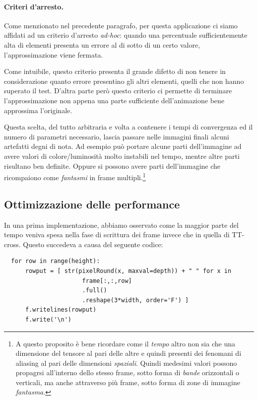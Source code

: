 \documentclass[11pt,a4paper]{article}
\begin{document}
\paragraph{Criteri d'arresto.}
Come menzionato nel precedente paragrafo, per questa applicazione ci siamo affidati ad un criterio d'arresto \emph{ad-hoc}: quando una percentuale sufficientemente alta di elementi presenta un errore al di sotto di un certo valore, l'approssimazione viene fermata.

Come intuibile, questo criterio presenta il grande difetto di non tenere in considerazione quanto errore presentino gli altri elementi, quelli che non hanno superato il test.
D'altra parte però questo criterio ci permette di terminare l'approssimazione non appena una parte sufficiente dell'animazione bene approssima l'originale.

Questa scelta, del tutto arbitraria e volta a contenere i tempi di convergenza ed il numero di parametri necessario, lascia passare nelle immagini finali alcuni artefatti degni di nota. Ad esempio può portare alcune parti dell'immagine ad avere valori di colore/luminosità molto instabili nel tempo, mentre altre parti risultano ben definite. Oppure si possono avere parti dell'immagine che ricompaiono come \emph{fantasmi} in frame  multipli.\footnote{A questo proposito è bene ricordare come il \emph{tempo} altro non sia che una dimensione del tensore al pari delle altre e quindi presenti dei fenomani di aliasing al pari delle dimensioni \emph{spaziali}. Quindi medesimi valori possono propagrsi all'interno dello stesso frame, sotto forma di \emph{bande} orizzontali o verticali, ma anche attraverso più frame, sotto forma di zone di immagine \emph{fantasma}.}

\subsection{Ottimizzazione delle performance}
In una prima implementazione,  abbiamo osservato come la maggior parte del tempo veniva spesa nella fase di scrittura dei frame invece che in quella di TT-cross.
Questo succedeva a causa del seguente codice: 

\begin{lstlisting}
  for row in range(height):
      rowput = [ str(pixelRound(x, maxval=depth)) + " " for x in 
                      frame[:,:,row]
                      .full()
                      .reshape(3*width, order='F') ]
      f.writelines(rowput)
      f.write('\n')
\end{lstlisting}
\end{document}
